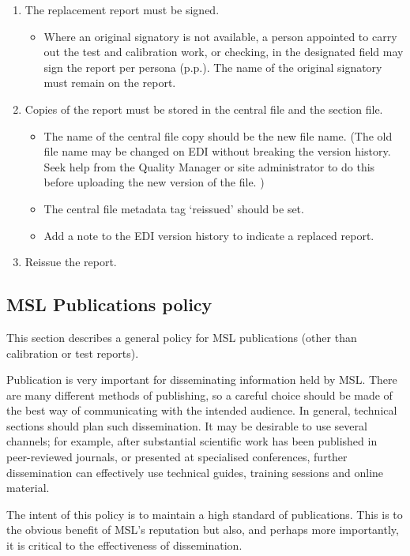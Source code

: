 {\begin{enumerate}
\item The replacement report must be signed.
\begin{itemize}
\item Where an original signatory is not available, a person appointed to carry out the test and calibration work, or checking, in the designated field may sign the report per persona (p.p.).  The name of the original signatory must remain on the report.
\end{itemize}

\item Copies of the report must be stored in the central file and the section file.
\begin{itemize}
\item The name of the central file copy should be the new file name. (The old file name may be changed on EDI without breaking the version history. Seek help from the Quality Manager or site administrator to do this before uploading the new version of the file. ) 
\item The central file metadata tag `reissued' should be set.
\item Add a note to the EDI version history to indicate a replaced report.
\end{itemize}
\item Reissue the report.

\end{enumerate}


}

\subsection{MSL Publications policy}
\label{ss:msl_publications_policy}

This section describes a general policy for MSL publications (other than calibration or test reports). 

Publication is very important for disseminating information held by MSL. There are many different methods of publishing, so a careful choice should be made of the best way of communicating with the intended audience. In general, technical sections should plan such dissemination. It may be desirable to use several channels; for example, after substantial scientific work has been published in peer-reviewed journals, or presented at specialised conferences, further dissemination can effectively use technical guides, training sessions and online material. 

The intent of this policy is to maintain a high standard of publications. This is to the obvious benefit of MSL’s reputation but also, and perhaps more importantly, it is critical to the effectiveness of dissemination. 

